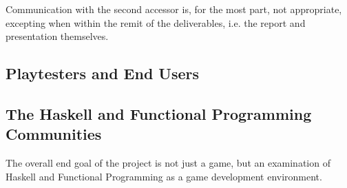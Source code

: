 Communication with the second accessor is, for the most part, not appropriate, excepting when within the remit of the deliverables, i.e. the report and presentation themselves.

\subsection{Playtesters and End Users}

\subsection{The Haskell and Functional Programming Communities}

The overall end goal of the project is not just a game, but an examination of Haskell and Functional Programming as a game development environment. 


